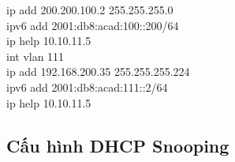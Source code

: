 \documentclass[a4paper, 12pt]{article}
\begin{document}
{\hspace*{2cm}ip add 200.200.100.2 255.255.255.0\\
\hspace*{2cm}ipv6 add 2001:db8:acad:100::200/64\\
\hspace*{2cm}ip help 10.10.11.5\\
\hspace*{2cm}int vlan 111\\
\hspace*{2cm}ip add 192.168.200.35 255.255.255.224\\
\hspace*{2cm}ipv6 add 2001:db8:acad:111::2/64\\
\hspace*{2cm}ip help 10.10.11.5\\}
\subsection{Cấu hình DHCP Snooping}
\end{document}
